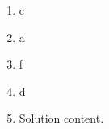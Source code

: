 \documentclass[12pt,twoside]{article}
\makeatletter
\def\emptycleardoublepage{\clearpage\if@twoside \ifodd\c@page\else
\thispagestyle{empty}%
\hbox{}\newpage\if@twocolumn\hbox{}\newpage\fi\fi\fi}
\makeatother
\begin{document}
\begin{multicols}{2}
\begin{enumerate}
 \end{enumerate}\end{multicols}\emptycleardoublepage{}\graphicspath{{/Users/jilan/Downloads/Randomizer/Randomizer/Sample Course/Sample Assessment/}}\begin{multicols}{2} \begin{enumerate}\item c\item a\item f\item d\def \a{7}\def \atwoone{2}\def \atwotwo{3}\def \atwothree{4}\def \btwothree{8}\def \sumtwothree{12}\def \diftwothree{-4}\def \bigtwothree{400}\def \powtwothree{4096}\def \logtwothree{0.6666666666666667}\def \factortwothree{91}\def \atwofour{1.71}\def \btwofour{1.372}\def \tooshorttwofour{10.1}\def \moneytwofour{10.10}\def \longertwofour{10.10000}\def \atwofive{0.12}\def \btwofive{0.12346}\def \athreeone{5}\def \bthreeone{4}\def \setthreetwo{[2, 5, 6]}\def \athreetwo{2}\def \bthreetwo{5}\def \cthreetwo{6}\def \controlthreethree{4}\def \athreethree{3}\def \topthreethree{0}\def \athreefour{5}\def \bthreefour{2}\def \listthreefour{[1, 2, 3, 4]}\def \afourone{16}\def \bfourone{-6}\def \fracfourone{\frac{-8}{3}}\def \rootfourtwo{20}\def \simplifiedfourtwo{2 \sqrt{5}}\def \sqrtlistfourtwo{[2, 5]}\def \outfourtwo{2}\def \infourtwo{5}\def \wowfourtwo{1}\def \afourthree{5}\def \nicethreefour{3x^{2}-x^{}+5}\def \nastythreefour{xyz^{3}+5}\def \cfourthree{4}\def \dfourthree{9}\def \infourthree{4x^{}}\def \outfourthree{+9y^{}}\def \afourfour{1110988}\def \nicefourfour{1,110,988}\def \goodfourfour{1,000,000.12345}\def \badfourfour{1,000,000.1}
\item Solution content.

\end{enumerate}
\end{multicols}
\end{document}
